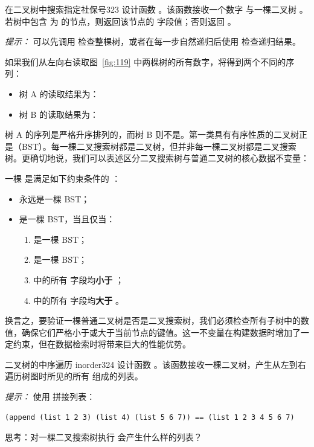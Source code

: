 \begin{exercise}{在二叉树中搜索指定社保号}{323}
设计函数 。该函数接收一个数字  与一棵二叉树 。若树中包含  为  的节点，则返回该节点的  字段值；否则返回 。

\emph{提示：} 可以先调用  检查整棵树，或者在每一步自然递归后使用  检查递归结果。
\end{exercise}

如果我们从左向右读取图~\ref{fig:119} 中两棵树的所有数字，将得到两个不同的序列：
\begin{itemize}
  \item 树 A 的读取结果为：
  \item 树 B 的读取结果为：
\end{itemize}

树 A 的序列是严格升序排列的，而树 B 则不是。第一类具有有序性质的二叉树正是（BST）。每一棵二叉搜索树都是二叉树，但并非每一棵二叉树都是二叉搜索树。更确切地说，我们可以表述区分二叉搜索树与普通二叉树的核心数据不变量：

\begin{notebox}
一棵  是满足如下约束条件的 ：
\begin{itemize}
  \item {} 永远是一棵 BST；
  \item {} 是一棵 BST，当且仅当：
  \begin{enumerate}
    \item {} 是一棵 BST；
    \item {} 是一棵 BST；
    \item {} 中的所有  字段均\textbf{小于} ；
    \item {} 中的所有  字段均\textbf{大于} 。
  \end{enumerate}
\end{itemize}
\end{notebox}

换言之，要验证一棵普通二叉树是否是二叉搜索树，我们必须检查所有子树中的数值，确保它们严格小于或大于当前节点的键值。这一不变量在构建数据时增加了一定约束，但在数据检索时将带来巨大的性能优势。

\begin{exercise}{二叉树的中序遍历 inorder}{324}
设计函数 。该函数接收一棵二叉树，产生从左到右遍历树图时所见的所有  组成的列表。

\emph{提示：} 使用  拼接列表：
\begin{lstlisting}[language=BSL]
(append (list 1 2 3) (list 4) (list 5 6 7)) == (list 1 2 3 4 5 6 7)
\end{lstlisting}
思考：对一棵二叉搜索树执行  会产生什么样的列表？
\end{exercise}

